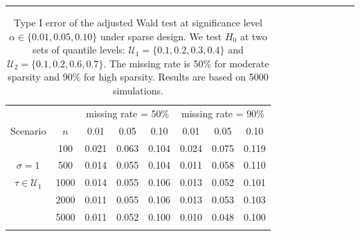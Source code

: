 \documentclass[times,sort&compress,3p]{elsarticle}
\theoremstyle{plain}%
\theoremstyle{definition}
\begin{document}
\renewcommand{\arraystretch}{1}
\begin{table}
\centering
\caption{Type I error of the adjusted Wald test at significance level $\alpha \in \{0.01, 0.05, 0.10\}$ under sparse design. We test $H_0$ at two sets of quantile levels: $\mathcal{U}_1 =
\{0.1, 0.2, 0.3, 0.4\}$ and $\mathcal{U}_2 = \{0.1, 0.2, 0.6, 0.7\}$. The missing rate is 50\% for moderate sparsity and 90\% for high sparsity. Results are based on 5000 simulations. }
\label{table:sparse.type.I}
\hrule
\begin{tabular}{cccccccc}
& &  \multicolumn{3}{c}{missing rate = 50\%}  &  \multicolumn{3}{c}{missing rate = 90\%}  \\ 
Scenario  & $n$ & 0.01 & 0.05 & 0.10 & 0.01 & 0.05 & 0.10 \\ \cmidrule(lr){3-5} \cmidrule(lr){6-8} 
   & 100 & 0.021  & 0.063  & 0.104  & 0.024  & 0.075  & 0.119  \\ 
$\sigma = 1$ &   500 & 0.014  & 0.055  & 0.104  & 0.011  & 0.058  & 0.110  \\ 
$ \tau \in \mathcal{U}_1$ &    1000 & 0.014  & 0.055  & 0.106  & 0.013  & 0.052  & 0.101  \\ 
  &  2000 & 0.011  & 0.055  & 0.106  & 0.013  & 0.053  & 0.103  \\ 
  &  5000 & 0.011  & 0.052  & 0.100  & 0.010  & 0.048  & 0.100  \\ 
     \\

\end{tabular}
\end{table}
\end{document}
